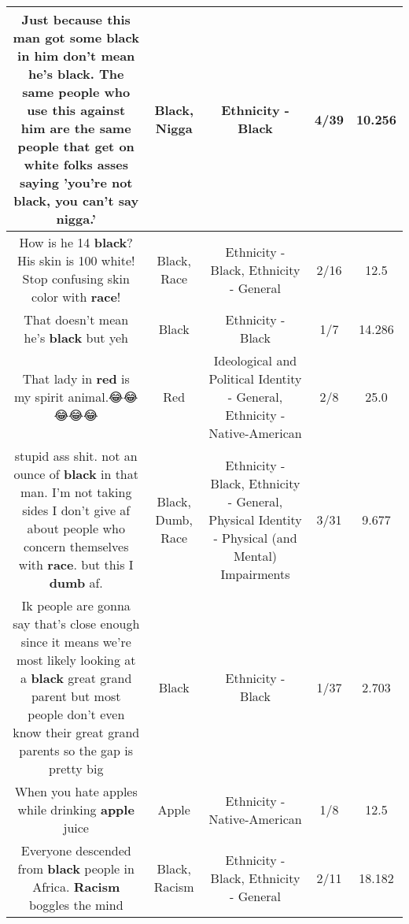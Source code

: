 \documentclass[11pt]{article}
\newlength\mylength
\begin{document}
\begin{center}
\begin{longtable}{|C{.65\mylength}|C{.30\mylength}|C{.12\mylength}|C{.12\mylength}|C{.12\mylength}|}
  \small Just because this man got some \textbf{black} in him don't mean he's \textbf{black}. The same people who use this against him are the same people that get on white folks asses saying 'you're not \textbf{black}, you can't say \textbf{nigga}.'\normalsize   & Black, Nigga & Ethnicity - Black & 4/39 & 10.256 \\  \hline
  \small How is he 14 \textbf{black}? His skin is 100 white! Stop confusing skin color with \textbf{race}!\normalsize   & Black, Race & Ethnicity - Black, Ethnicity - General & 2/16 & 12.5 \\  \hline
  \small That doesn't mean he's \textbf{black} but yeh\normalsize   & Black & Ethnicity - Black & 1/7 & 14.286 \\  \hline
  \small That lady in \textbf{r\textbf{ed}} is my spirit animal.😂😂😂😂😂\normalsize   & Red &  Ideological and Political Identity - General, Ethnicity - Native-American & 2/8 & 25.0 \\  \hline
  \small stupid ass shit. not an ounce of \textbf{black} in that man. I'm not taking sides I don't give af about people who concern themselves with \textbf{race}. but this I \textbf{dumb} af.\normalsize   & Black, Dumb, Race & Ethnicity - Black, Ethnicity - General, Physical Identity - Physical (and Mental) Impairments & 3/31 & 9.677 \\  \hline
  \small Ik people are gonna say that's close enough since it means we're most likely looking at a \textbf{black} great grand parent but most people don't even know their great grand parents so the gap is pretty big\normalsize   & Black & Ethnicity - Black & 1/37 & 2.703 \\  \hline
  \small When you hate apples while drinking \textbf{apple} juice\normalsize   & Apple & Ethnicity - Native-American & 1/8 & 12.5 \\  \hline
  \small Everyone descended from \textbf{black} people in Africa. \textbf{Racism} boggles the mind\normalsize   & Black, Racism & Ethnicity - Black, Ethnicity - General & 2/11 & 18.182 \\  \hline

\end{longtable}
\end{center}
\end{document}
